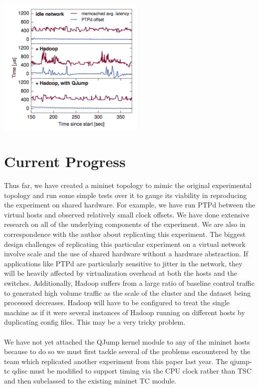 \documentclass[12pt]{article}
\begin{document}
	\includegraphics[width=200pt]{qjump.png} 
	
\section*{Current Progress}
	Thus far, we have created a mininet topology to mimic the original experimental topology and run some simple tests over it to gauge its viability in reproducing the experiment on shared hardware. For example, we have run PTPd between the virtual hosts and observed relatively small clock offsets. We have done extensive research on all of the underlying components of the experiment. We are also in correspondence with the author about replicating this experiment. The biggest design challenges of replicating this particular experiment on a virtual network involve scale and the use of shared hardware without a hardware abstraction. If applications like PTPd are particularly sensitive to jitter in the network, they will be heavily affected by virtualization overhead at both the hosts and the switches. Additionally, Hadoop suffers from a large ratio of baseline control traffic to generated high volume traffic as the scale of the cluster and the dataset being processed decreases. Hadoop will have to be configured to treat the single machine as if it were several instances of Hadoop running on different hosts by duplicating config files. This may be a very tricky problem.\\
	\\	
	 We have not yet attached the QJump kernel module to any of the mininet hosts because to do so we must first tackle several of the problems encountered by the team which replicated another experiment from this paper last year. The qjump-tc qdisc must be modified to support timing via the CPU clock rather than TSC and then subclassed to the existing mininet TC module.
	 
\end{document}
